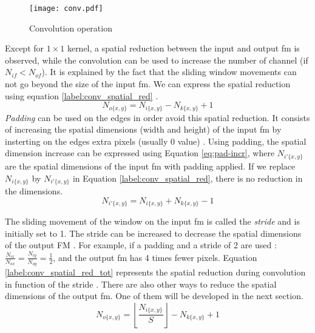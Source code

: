 %
\begin{figure}[H]
    \centering
    \texttt{[image: conv.pdf]}
    \caption{Convolution operation}
    \label{fig:convolution}
\end{figure}
%
Except for $1 \times 1$ kernel, a spatial reduction between the input and output \acrshort{fm} is observed, while the convolution can be used to increase the number of channel (if $N_{if} < N_{of}$). It is explained by the fact that the sliding window movements can not go beyond the size of the input \acrshort{fm}. We can express the spatial reduction using equation \eqref{label:conv_spatial_red} \cite{ma_optimizing_2018}.
%
\begin{equation}
    N_{o\{x,y\}} = N_{i\{x,y\}} - N_{k\{x,y\}} + 1
    \label{label:conv_spatial_red}
\end{equation}
%
\textit{Padding} can be used on the edges in order avoid this spatial reduction. It consists of increasing the spatial dimensions (width and height) of the input \acrshort{fm} by insterting on the edges extra pixels (usually 0 value) \cite{liu_fpga-based_2019}. Using padding, the spatial dimension increase can be expressed using Equation \eqref{eq:pad-incr}, where $N_{i'\{x,y\}}$ are the spatial dimensions of the input \acrshort{fm} with padding applied. If we replace $N_{i\{x,y\}}$ by $N_{i'\{x,y\}}$ in Equation \eqref{label:conv_spatial_red}, there is no reduction in the dimensions.
%
\begin{equation}
    N_{i'\{x,y\}} = N_{i\{x,y\}} + N_{k\{x,y\}} - 1
    \label{eq:pad-incr}
\end{equation}

The sliding movement of the window on the input \acrshort{fm} is called the \textit{stride} and is initially set to 1. The stride can be increased to decrease the spatial dimensions of the output FM \cite{liu_fpga-based_2019}. For example, if a padding and a stride of 2 are used : $\frac{N_{ix}}{N_{ox}} = \frac{N_{iy}}{N_{oy}} = \frac{1}{2}$, and the output \acrshort{fm} has 4 times fewer pixels. Equation \eqref{label:conv_spatial_red_tot} represents the spatial reduction during convolution in function of the stride \cite{ma_optimizing_2018}. There are also other ways to reduce the spatial dimensions of the output \acrshort{fm}. One of them will be developed in the next section.
%
\begin{equation}
    N_{o\{x,y\}} = \left\lfloor \frac{ N_{i\{x,y\}}}{S} \right\rfloor - N_{k\{x,y\}} + 1
    \label{label:conv_spatial_red_tot}
\end{equation}

